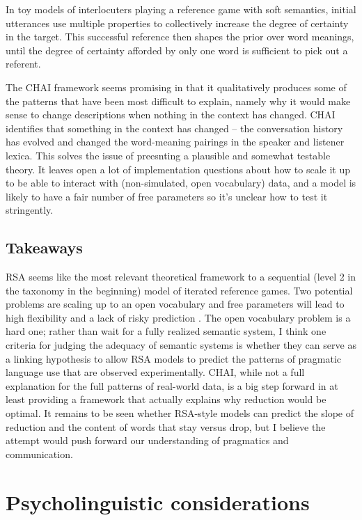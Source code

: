\documentclass[]{article}
\begin{document}
In toy models of interlocuters playing a reference game with soft semantics, initial utterances use multiple properties to collectively increase the degree of certainty in the target. This successful reference then shapes the prior over word meanings, until the degree of certainty afforded by only one word is sufficient to pick out a referent. 

The CHAI framework seems promising in that it qualitatively produces some of the patterns that have been most difficult to explain, namely why it would make sense to change descriptions when nothing in the context has changed. CHAI identifies that something in the context has changed -- the conversation history has evolved and changed the word-meaning pairings in the speaker and listener lexica. This solves the issue of preesnting a plausible and somewhat testable theory. It leaves open a lot of implementation questions about how to scale it up to be able to interact with (non-simulated, open vocabulary) data, and a model is likely to have a fair number of free parameters so it's unclear how to test it stringently. 



\subsection{Takeaways}


RSA seems like the most relevant theoretical framework to a sequential (level 2 in the taxonomy in the beginning) model of iterated reference games. Two potential problems are scaling up to an open vocabulary and free parameters will lead to high flexibility and a lack of risky prediction \citep{meehl1990}. The open vocabulary problem is a hard one; rather than wait for a fully realized semantic system, I think one criteria for judging the adequacy of semantic systems is whether they can serve as a linking hypothesis to allow RSA models to predict the patterns of pragmatic language use that are observed experimentally. CHAI, while not a full explanation for the full patterns of real-world data, is a big step forward in at least providing a framework that actually explains why reduction would be optimal. It remains to be seen whether RSA-style models can predict the slope of reduction and the content of words that stay versus drop, but I believe the attempt would push forward our understanding of pragmatics and communication. 

\section{Psycholinguistic considerations}
\end{document}

